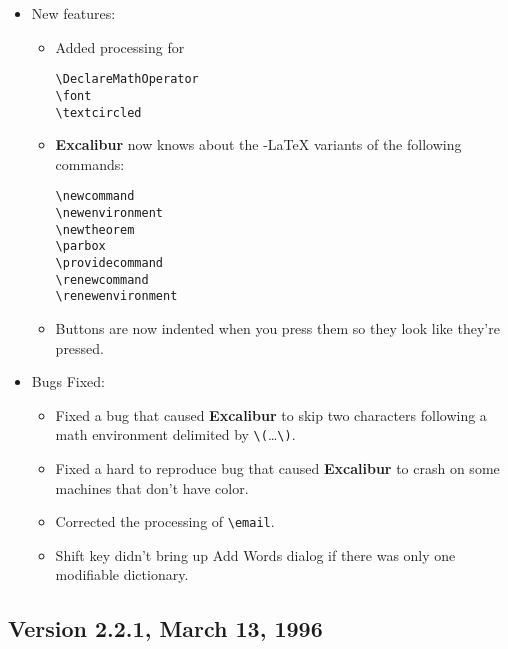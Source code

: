 \documentclass[11pt,titlepage]{article}
\newcommand{\ex}{\textbf{Excalibur}}
\newcommand{\AmS}{\latex{{\protect\the\textfont2
        A\kern-.1667em\lower.5ex\hbox{M}\kern-.125emS}}\html{AMS}}
\begin{document}
\begin{itemize}
\item New features:

  \begin{itemize}
  \item Added processing for
\begin{verbatim}
\DeclareMathOperator
\font
\textcircled
\end{verbatim}

  \item \ex{} now knows about the \AmS-\LaTeX{} variants of the
    following commands:
\begin{verbatim}
\newcommand
\newenvironment
\newtheorem
\parbox
\providecommand
\renewcommand
\renewenvironment
\end{verbatim}

  \item Buttons are now indented when you press them so they look like
    they're pressed.
  \end{itemize}

\item Bugs Fixed:

  \begin{itemize}

  \item Fixed a bug that caused \ex{} to skip two characters following
    a math environment delimited by \verb+\(+\ldots\verb+\)+.

  \item Fixed a hard to reproduce bug that caused \ex{} to crash
    on some machines that don't have color.

  \item Corrected the processing of \verb+\email+.

  \item Shift key didn't bring up Add Words dialog if there was only
    one modifiable dictionary.

  \end{itemize}

\end{itemize}

\subsection{Version 2.2.1, March 13, 1996}
\end{document}
